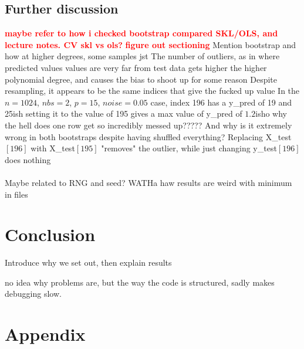\documentclass[a4paper]{article}
\newcommand\red[1]{\textcolor{red}{\textbf{#1}}}
\begin{document}
\subsection{Further discussion} \label{sub:discussion}
\red{maybe refer to how i checked bootstrap compared SKL/OLS, and lecture notes. CV skl vs ols?}
\red{figure out sectioning}
Mention bootstrap and how at higher degrees, some samples jst
The number of outliers, as in where predicted values values are very far from test data gets higher the higher polynomial degree, and causes the bias to shoot up for some reason Despite resampling, it appears to be the same indices that give the fucked up value
In the $n=1024$, $nbs=2$, $p=15$, $noise=0.05$ case, index 196 has a y\_pred of 19 and 25ish setting it to the value of 195 gives a max value of y\_pred of $1.2$isho why the hell does one row get so incredibly messed up?????
And why is it extremely wrong in both bootstraps despite having shuffled everything?
Replacing X\_test$[196]$ with X\_test$[195]$ "removes" the outlier, while just changing y\_test$[196]$ does nothing 
\\\\
Maybe related to RNG and seed?
WATHa haw results are weird with minimum in files
\section{Conclusion} \label{chap:conclusion}
Introduce why we set out, then explain results

no idea why problems are, but the way the code is structured, sadly makes debugging slow.

\appendix
\section*{Appendix} \label{chap:appendix}
\end{document}
